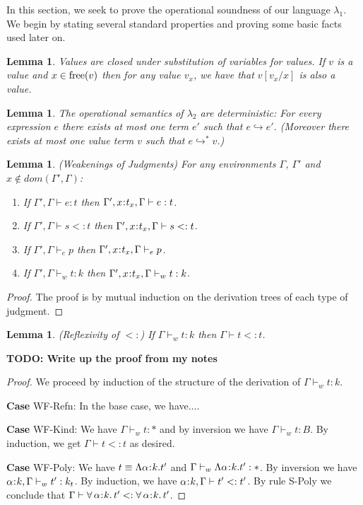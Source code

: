 \documentclass[11pt]{article}
\newtheorem{lemma}[theorem]{Lemma}
\newcommand{\al}{\alpha}
\newcommand{\bind}{\hspace{0.05em}{:}\hspace{0.05em}} %
\newcommand{\step}{\hookrightarrow}
\newcommand{\many}{\hookrightarrow^*}
\newcommand{\polytype}[3]{\forall\, #1\bind #2.\, #3}
\begin{document}
In this section, we seek to prove the operational soundness of our language $\lambda_1$. We begin by stating several standard properties and proving some basic facts used later on.

\begin{lemma}\label{value-sub}
Values are closed under substitution of variables for values. If $v$ is a value and $x \in {\rm free}(v)$ then for any value $v_x$, we have that $v[v_x/x]$ is also a value.
\end{lemma}

\begin{lemma}\label{step-determ}
The operational semantics of $\lambda_2$ are deterministic: For every expression $e$ there exists at most one term $e'$ such that $e \step e'$. (Moreover there exists at most one value term $v$ such that $e \many v$.)
\end{lemma}

\begin{lemma}\label{weakenings}
(Weakenings of Judgments) For any environments $\Gamma$, $\Gamma'$ and $x \not\in dom(\Gamma', \Gamma)$:
\begin{enumerate}
\item If $\Gamma', \Gamma \vdash e : t$ then $\Gamma', x\bind t_x, \Gamma \vdash e :  t$.
\item If $\Gamma', \Gamma \vdash s <: t$ then $\Gamma', x\bind t_x, \Gamma \vdash s <: t$.
\item If $\Gamma', \Gamma \vdash_e p$ then $\Gamma', x\bind t_x, \Gamma \vdash_e p$.
\item If $\Gamma', \Gamma \vdash_w t:k$ then $\Gamma', x\bind t_x, \Gamma \vdash_w t:k$.
\end{enumerate}
\end{lemma}
\begin{proof}
The proof is by mutual induction on the derivation trees of each type of judgment.
%
%
%
\end{proof}


\begin{lemma}\label{sub-refl}
(Reflexivity of $<:$) If $\Gamma \vdash_w t : k$ then $\Gamma \vdash t <: t$.
\end{lemma} {\bf TODO: Write up the proof from my notes}

\begin{proof} We proceed by induction of the structure of the derivation of $\Gamma \vdash_w t : k$.

{\bf Case} {\sc WF-Refn}: In the base case, we have....
	
	
{\bf Case} {\sc WF-Kind}:  We have $\Gamma \vdash_w t : *$ and by inversion we have $\Gamma \vdash_w t : B$. By induction, we get $\Gamma \vdash t <: t$ as desired.

{\bf Case} {\sc WF-Poly}: We have $t \equiv \Lambda\al\bind k.t'$ and $\Gamma \vdash_w\Lambda\al\bind k.t' : *$. By inversion we have %
$\al\bind k, \Gamma\vdash_w t': k_t$. By induction, we have
$\al\bind k, \Gamma\vdash t' <: t'$. By rule {\sc S-Poly} we conclude that $\Gamma \vdash \polytype{\al}{k}{t'} <: \polytype{\al}{k}{t'}$.
\end{proof}
\end{document}
